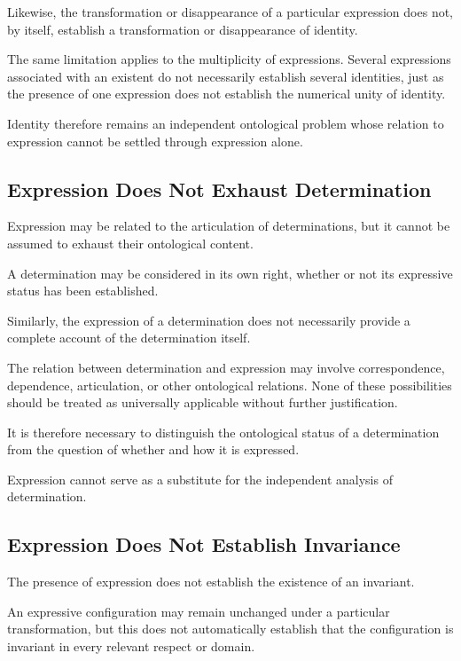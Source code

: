 Likewise, the transformation or disappearance of
a particular expression does not, by itself, establish
a transformation or disappearance of identity.

The same limitation applies to the multiplicity
of expressions. Several expressions associated
with an existent do not necessarily establish several
identities, just as the presence of one expression
does not establish the numerical unity of identity.

Identity therefore remains an independent ontological
problem whose relation to expression cannot be
settled through expression alone.

\subsection{Expression Does Not Exhaust Determination}

Expression may be related to the articulation of
determinations, but it cannot be assumed to exhaust
their ontological content.

A determination may be considered in its own right,
whether or not its expressive status has been established.

Similarly, the expression of a determination does
not necessarily provide a complete account of
the determination itself.

The relation between determination and expression
may involve correspondence, dependence, articulation,
or other ontological relations. None of these possibilities
should be treated as universally applicable without
further justification.

It is therefore necessary to distinguish the ontological
status of a determination from the question of whether
and how it is expressed.

Expression cannot serve as a substitute for the
independent analysis of determination.

\subsection{Expression Does Not Establish Invariance}

The presence of expression does not establish
the existence of an invariant.

An expressive configuration may remain unchanged
under a particular transformation, but this does
not automatically establish that the configuration
is invariant in every relevant respect or domain.

